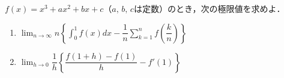 \documentclass[../../main.tex]{subfiles}
\begin{document}
$f(x)=x^3+ax^2+bx+c$（$a, \, b, \, c$は定数）のとき，次の極限値を求めよ．
\begin{enumerate}
  \item $\displaystyle\lim_{n\to\infty}n\left\{ \int_0^1 f(x)dx-
    \dfrac{1}{n}\sum_{k=1}^nf\left( \dfrac{k}{n} \right) \right\}$
  \item $\displaystyle\lim_{h\to0}\dfrac{1}{h}\left\{
    \dfrac{f(1+h)-f(1)}{h}-f'(1) \right\}$
\end{enumerate}
\end{document}
